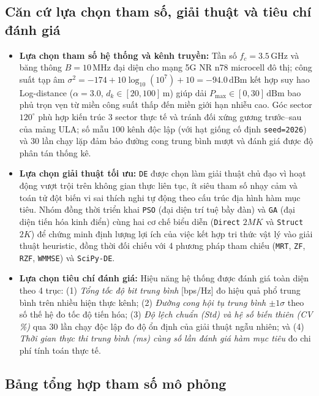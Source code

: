 \documentclass[12pt, a4paper]{article}
\begin{document}
\subsection{Căn cứ lựa chọn tham số, giải thuật và tiêu chí đánh giá}
\begin{itemize}
    \item \textbf{Lựa chọn tham số hệ thống và kênh truyền:} Tần số $f_c = 3.5\,\text{GHz}$ và băng thông $B = 10\,\text{MHz}$ đại diện cho mạng 5G NR n78 microcell đô thị; công suất tạp âm $\sigma^2 = -174 + 10\log_{10}(10^7) + 10 = -94.0\,\text{dBm}$ kết hợp suy hao Log-distance ($\alpha = 3.0$, $d_k \in [20, 100]\,\text{m}$) giúp dải $P_{\max} \in [0, 30]\,\text{dBm}$ bao phủ trọn vẹn từ miền công suất thấp đến miền giới hạn nhiễu cao. Góc sector $120^\circ$ phù hợp kiến trúc 3 sector thực tế và tránh đối xứng gương trước--sau của mảng ULA; số mẫu $100$ kênh độc lập (với hạt giống cố định \texttt{seed=2026}) và $30$ lần chạy lặp đảm bảo đường cong trung bình mượt và đánh giá được độ phân tán thống kê.
    \item \textbf{Lựa chọn giải thuật tối ưu:} \texttt{DE} được chọn làm giải thuật chủ đạo vì hoạt động vượt trội trên không gian thực liên tục, ít siêu tham số nhạy cảm và toán tử đột biến vi sai thích nghi tự động theo cấu trúc địa hình hàm mục tiêu. Nhóm đồng thời triển khai \texttt{PSO} (đại diện trí tuệ bầy đàn) và \texttt{GA} (đại diện tiến hóa kinh điển) cùng hai cơ chế biểu diễn (\texttt{Direct} $2MK$ và \texttt{Struct} $2K$) để chứng minh định lượng lợi ích của việc kết hợp tri thức vật lý vào giải thuật heuristic, đồng thời đối chiếu với 4 phương pháp tham chiếu (\texttt{MRT}, \texttt{ZF}, \texttt{RZF}, \texttt{WMMSE}) và \texttt{SciPy-DE}.
    \item \textbf{Lựa chọn tiêu chí đánh giá:} Hiệu năng hệ thống được đánh giá toàn diện theo 4 trục: (1) \emph{Tổng tốc độ bit trung bình} [bps/Hz] đo hiệu quả phổ trung bình trên nhiều hiện thực kênh; (2) \emph{Đường cong hội tụ trung bình $\pm 1\sigma$} theo số thế hệ đo tốc độ tiến hóa; (3) \emph{Độ lệch chuẩn (Std) và hệ số biến thiên (CV \%)} qua 30 lần chạy độc lập đo độ ổn định của giải thuật ngẫu nhiên; và (4) \emph{Thời gian thực thi trung bình (ms) cùng số lần đánh giá hàm mục tiêu} đo chi phí tính toán thực tế.
\end{itemize}

\subsection{Bảng tổng hợp tham số mô phỏng}
\end{document}
